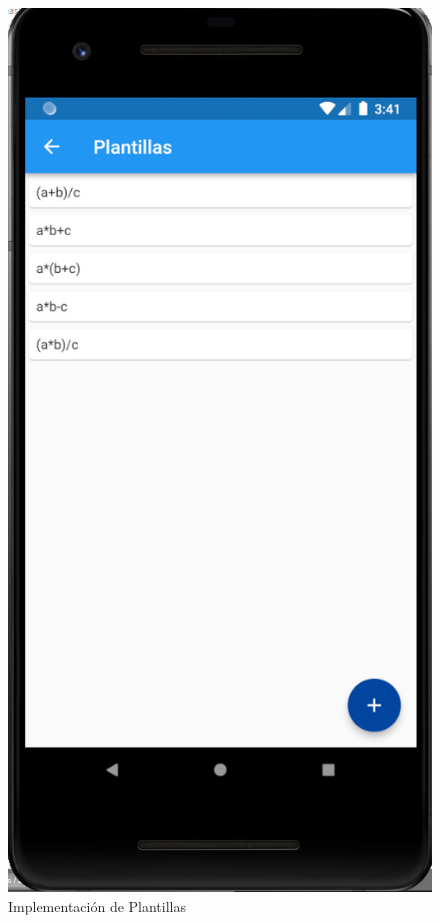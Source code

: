 \documentclass{article}
\begin{document}
\begin{figure}[H]
    \centering
    \includegraphics[scale=0.8]{imgs/Imp/Plantillas}
    \caption{Implementación de Plantillas}
    \label{fig:implementacion_06}
\end{figure}
\end{document}
